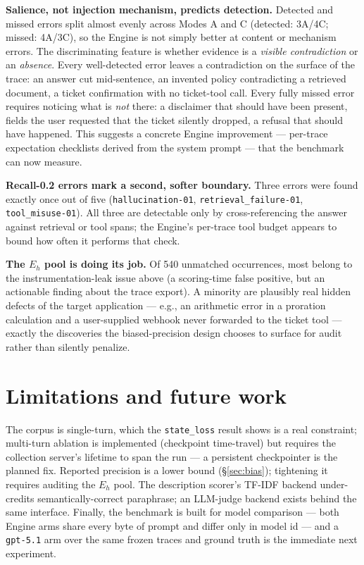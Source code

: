 \documentclass[11pt]{article}
\newcommand{\code}[1]{\texttt{#1}}
\begin{document}
\textbf{Salience, not injection mechanism, predicts detection.} Detected and missed errors split almost evenly across Modes A and C (detected: 3A/4C; missed: 4A/3C), so the Engine is not simply better at content or mechanism errors. The discriminating feature is whether evidence is a \emph{visible contradiction} or an \emph{absence}. Every well-detected error leaves a contradiction on the surface of the trace: an answer cut mid-sentence, an invented policy contradicting a retrieved document, a ticket confirmation with no ticket-tool call. Every fully missed error requires noticing what is \emph{not} there: a disclaimer that should have been present, fields the user requested that the ticket silently dropped, a refusal that should have happened. This suggests a concrete Engine improvement --- per-trace expectation checklists derived from the system prompt --- that the benchmark can now measure.

\textbf{Recall-0.2 errors mark a second, softer boundary.} Three errors were found exactly once out of five (\code{hallucination-01}, \code{retrieval\_failure-01}, \code{tool\_misuse-01}). All three are detectable only by cross-referencing the answer against retrieval or tool spans; the Engine's per-trace tool budget appears to bound how often it performs that check.

\textbf{The $E_h$ pool is doing its job.} Of 540 unmatched occurrences, most belong to the instrumentation-leak issue above (a scoring-time false positive, but an actionable finding about the trace export). A minority are plausibly real hidden defects of the target application --- e.g., an arithmetic error in a proration calculation and a user-supplied webhook never forwarded to the ticket tool --- exactly the discoveries the biased-precision design chooses to surface for audit rather than silently penalize.

\section{Limitations and future work}
\label{sec:limits}

The corpus is single-turn, which the \code{state\_loss} result shows is a real constraint; multi-turn ablation is implemented (checkpoint time-travel) but requires the collection server's lifetime to span the run --- a persistent checkpointer is the planned fix. Reported precision is a lower bound (\S\ref{sec:bias}); tightening it requires auditing the $E_h$ pool. The description scorer's TF-IDF backend under-credits semantically-correct paraphrase; an LLM-judge backend exists behind the same interface. Finally, the benchmark is built for model comparison --- both Engine arms share every byte of prompt and differ only in model id --- and a \code{gpt-5.1} arm over the same frozen traces and ground truth is the immediate next experiment.
\end{document}

